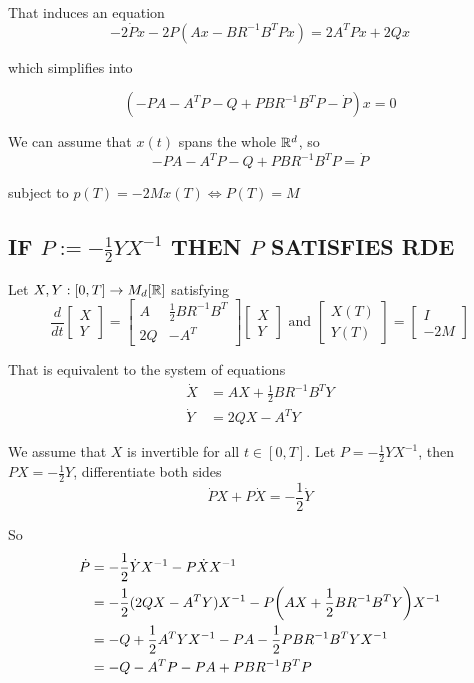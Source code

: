 That induces an equation
$$
	- 2 \dot{P} x - 2 P (Ax - B R^{-1} B^T Px) = 2 A^T Px + 2Qx
$$

which simplifies into

$$
	(- P A - A^T P - Q +  P B R^{-1} B^T P  - \dot{P}) x = 0
$$

We can assume that $x(t)$ spans the whole $\mathbb{R}^d$, so
$$
	- P A - A^T P - Q +  P B R^{-1} B^T P = \dot{P}
$$

subject to $p(T) = -2Mx(T) \iff P(T) = M$

\subsection{IF $P := -\frac{1}{2} Y X^{-1} $ THEN $P$ SATISFIES RDE}

Let $X, Y: [0, T] \to M_d[\mathbb{R}]$ satisfying
$$
	\frac{d}{dt} \begin{bmatrix}
		X \\
		Y
	\end{bmatrix} = \begin{bmatrix}
		A & \frac{1}{2} B R^{-1} B^T \\
		2Q & -A^T
	\end{bmatrix} \begin{bmatrix}
		X \\
		Y
	\end{bmatrix} 
	\text{ and } \begin{bmatrix}
		X(T) \\
		Y(T)
	\end{bmatrix} = \begin{bmatrix}
		I \\
		-2M
	\end{bmatrix}
$$

That is equivalent to the system of equations
\begin{align*}
	\dot{X} &= AX + \frac{1}{2} B R^{-1} B^T Y \\
	\dot{Y} &= 2QX - A^T Y
\end{align*}

We assume that $X$ is invertible for all $t \in [0, T]$. Let $P = - \frac{1}{2} Y X^{-1}$, then $PX = - \frac{1}{2} Y$, differentiate both sides
$$
	\dot{P} X + P \dot{X} = - \frac{1}{2} \dot{Y}
$$

So
\begin{align*}
	\dot{P} 
	&= - \frac{1}{2} \dot{Y} X^{-1} - P \dot{X} X^{-1} \\
	&= - \frac{1}{2} (2QX - A^T Y) X^{-1} - P \tuple*{AX + \frac{1}{2} B R^{-1} B^T Y} X^{-1} \\
	&= - Q + \frac{1}{2} A^T Y X^{-1} - P A - \frac{1}{2} PBR^{-1} B^T Y X^{-1} \\
	&= - Q - A^T P - PA  + PBR^{-1} B^T P
\end{align*}

